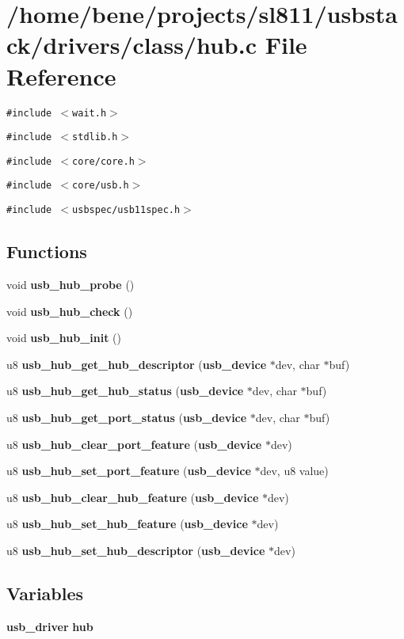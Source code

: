 \section{/home/bene/projects/sl811/usbstack/drivers/class/hub.c File Reference}
\label{hub_8c}
{\tt \#include $<$wait.h$>$}\par
{\tt \#include $<$stdlib.h$>$}\par
{\tt \#include $<$core/core.h$>$}\par
{\tt \#include $<$core/usb.h$>$}\par
{\tt \#include $<$usbspec/usb11spec.h$>$}\par
\subsection*{Functions}
\begin{CompactItemize}
\item 
void {\bf usb\_\-hub\_\-probe} ()
\item 
void {\bf usb\_\-hub\_\-check} ()
\item 
void {\bf usb\_\-hub\_\-init} ()
\item 
u8 {\bf usb\_\-hub\_\-get\_\-hub\_\-descriptor} ({\bf usb\_\-device} $\ast$dev, char $\ast$buf)
\item 
u8 {\bf usb\_\-hub\_\-get\_\-hub\_\-status} ({\bf usb\_\-device} $\ast$dev, char $\ast$buf)
\item 
u8 {\bf usb\_\-hub\_\-get\_\-port\_\-status} ({\bf usb\_\-device} $\ast$dev, char $\ast$buf)
\item 
u8 {\bf usb\_\-hub\_\-clear\_\-port\_\-feature} ({\bf usb\_\-device} $\ast$dev)
\item 
u8 {\bf usb\_\-hub\_\-set\_\-port\_\-feature} ({\bf usb\_\-device} $\ast$dev, u8 value)
\item 
u8 {\bf usb\_\-hub\_\-clear\_\-hub\_\-feature} ({\bf usb\_\-device} $\ast$dev)
\item 
u8 {\bf usb\_\-hub\_\-set\_\-hub\_\-feature} ({\bf usb\_\-device} $\ast$dev)
\item 
u8 {\bf usb\_\-hub\_\-set\_\-hub\_\-descriptor} ({\bf usb\_\-device} $\ast$dev)
\end{CompactItemize}
\subsection*{Variables}
\begin{CompactItemize}
\item 
{\bf usb\_\-driver} {\bf hub}
\end{CompactItemize}



